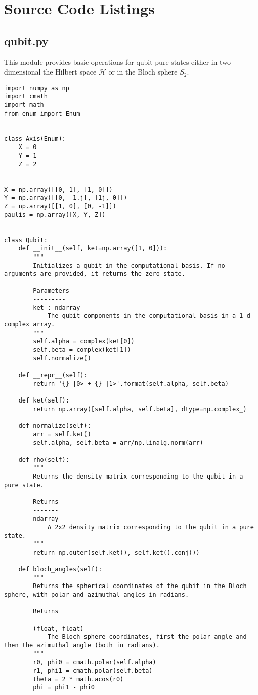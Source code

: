 \section{Source Code Listings}\label{section:source}
\subsection{qubit.py}\label{section:listing_qubit}
This module provides basic operations for qubit pure states either in two-dimensional the Hilbert space $\mathcal{H}$ or in the Bloch sphere $S_2$. 
\begin{verbatim}
import numpy as np
import cmath
import math
from enum import Enum


class Axis(Enum):
    X = 0
    Y = 1
    Z = 2


X = np.array([[0, 1], [1, 0]])
Y = np.array([[0, -1.j], [1j, 0]])
Z = np.array([[1, 0], [0, -1]])
paulis = np.array([X, Y, Z])


class Qubit:
    def __init__(self, ket=np.array([1, 0])):
        """
        Initializes a qubit in the computational basis. If no arguments are provided, it returns the zero state.

        Parameters
        ---------
        ket : ndarray
            The qubit components in the computational basis in a 1-d complex array.
        """
        self.alpha = complex(ket[0])
        self.beta = complex(ket[1])
        self.normalize()

    def __repr__(self):
        return '{} |0> + {} |1>'.format(self.alpha, self.beta)

    def ket(self):
        return np.array([self.alpha, self.beta], dtype=np.complex_)

    def normalize(self):
        arr = self.ket()
        self.alpha, self.beta = arr/np.linalg.norm(arr)

    def rho(self):
        """
        Returns the density matrix corresponding to the qubit in a pure state.

        Returns
        -------
        ndarray
            A 2x2 density matrix corresponding to the qubit in a pure state.
        """
        return np.outer(self.ket(), self.ket().conj())

    def bloch_angles(self):
        """
        Returns the spherical coordinates of the qubit in the Bloch sphere, with polar and azimuthal angles in radians.

        Returns
        -------
        (float, float)
            The Bloch sphere coordinates, first the polar angle and then the azimuthal angle (both in radians).
        """
        r0, phi0 = cmath.polar(self.alpha)
        r1, phi1 = cmath.polar(self.beta)
        theta = 2 * math.acos(r0)
        phi = phi1 - phi0


\end{verbatim}
